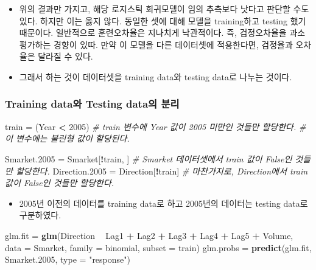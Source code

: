 \documentclass[]{article}
\newenvironment{Shaded}{\begin{snugshade}}{\end{snugshade}}
\newcommand{\KeywordTok}[1]{\textcolor[rgb]{0.13,0.29,0.53}{\textbf{#1}}}
\newcommand{\DataTypeTok}[1]{\textcolor[rgb]{0.13,0.29,0.53}{#1}}
\newcommand{\DecValTok}[1]{\textcolor[rgb]{0.00,0.00,0.81}{#1}}
\newcommand{\StringTok}[1]{\textcolor[rgb]{0.31,0.60,0.02}{#1}}
\newcommand{\CommentTok}[1]{\textcolor[rgb]{0.56,0.35,0.01}{\textit{#1}}}
\newcommand{\OperatorTok}[1]{\textcolor[rgb]{0.81,0.36,0.00}{\textbf{#1}}}
\newcommand{\NormalTok}[1]{#1}
\providecommand{\tightlist}{%
  \setlength{\itemsep}{0pt}\setlength{\parskip}{0pt}}
\begin{document}
\begin{itemize}
\tightlist
\item
  위의 결과만 가지고, 해당 로지스틱 회귀모델이 임의 추측보다 낫다고
  판단할 수도 있다. 하지만 이는 옳지 않다. 동일한 셋에 대해 모델을
  training하고 testing 했기 때문이다. 일반적으로 훈련오차율은 지나치게
  낙관적이다. 즉, 검정오차율을 과소평가하는 경향이 있따. 만약 이 모델을
  다른 데이터셋에 적용한다면, 검정율과 오차율은 달라질 수 있다.
\item
  그래서 하는 것이 데이터셋을 training data와 testing data로 나누는
  것이다.
\end{itemize}

\subsubsection{Training data와 Testing data의
분리}\label{training-data-testing-data-}

\begin{Shaded}
\begin{Highlighting}[]
\NormalTok{train =}\StringTok{ }\NormalTok{(Year }\OperatorTok{<}\StringTok{ }\DecValTok{2005}\NormalTok{) }\CommentTok{# train 변수에 Year 값이 2005 미만인 것들만 할당한다.}
\CommentTok{# 이 변수에는 불린형 값이 할당된다.}

\NormalTok{Smarket.}\DecValTok{2005}\NormalTok{ =}\StringTok{ }\NormalTok{Smarket[}\OperatorTok{!}\NormalTok{train, ] }\CommentTok{# Smarket 데이터셋에서 train 값이 False인 것들만 할당한다.}
\NormalTok{Direction.}\DecValTok{2005}\NormalTok{ =}\StringTok{ }\NormalTok{Direction[}\OperatorTok{!}\NormalTok{train] }\CommentTok{# 마찬가지로, Direction에서 train 값이 False인 것들만 할당한다.}
\end{Highlighting}
\end{Shaded}

\begin{itemize}
\tightlist
\item
  2005년 이전의 데이터를 training data로 하고 2005년의 데이터는 testing
  data로 구분하였다.
\end{itemize}

\begin{Shaded}
\begin{Highlighting}[]
\NormalTok{glm.fit =}\StringTok{ }\KeywordTok{glm}\NormalTok{(Direction }\OperatorTok{~}\StringTok{ }\NormalTok{Lag1 }\OperatorTok{+}\StringTok{ }\NormalTok{Lag2 }\OperatorTok{+}\StringTok{ }\NormalTok{Lag3 }\OperatorTok{+}\StringTok{ }\NormalTok{Lag4 }\OperatorTok{+}\StringTok{ }\NormalTok{Lag5 }\OperatorTok{+}\StringTok{ }\NormalTok{Volume,}
              \DataTypeTok{data =}\NormalTok{ Smarket,}
              \DataTypeTok{family =}\NormalTok{ binomial,}
              \DataTypeTok{subset =}\NormalTok{ train)}
\NormalTok{glm.probs =}\StringTok{ }\KeywordTok{predict}\NormalTok{(glm.fit, Smarket.}\DecValTok{2005}\NormalTok{, }\DataTypeTok{type =} \StringTok{"response"}\NormalTok{)}
\end{Highlighting}
\end{Shaded}
\end{document}
